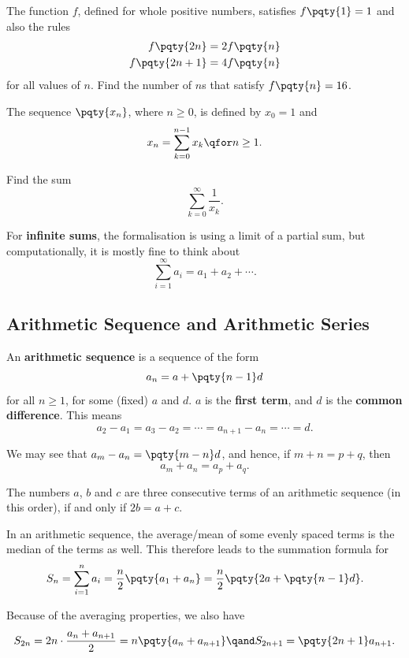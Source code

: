 \documentclass{article}
\begin{document}
\begin{example}
    The function \(f\), defined for whole positive numbers, satisfies \(f\pqty{1} = 1\) and also the rules
    \begin{align*}
        f\pqty{2n} &= 2 f\pqty{n} \\
        f\pqty{2n + 1} &= 4 f\pqty{n}
    \end{align*}
    for all values of \(n\). Find the number of \(n\)s that satisfy \(f\pqty{n} = 16\).
\end{example}

\begin{example}
    The sequence \(\pqty{x_n}\), where \(n \geq 0\), is defined by \(x_0 = 1\) and
    \[
        x_n = \sum_{k = 0}^{n - 1} x_k \qfor n \geq 1.
    \]  

    Find the sum
    \[
        \sum_{k = 0}^{\infty} \frac{1}{x_k}.
    \]
\end{example}

For \textbf{infinite sums}, the formalisation is using a limit of a partial sum, but computationally, it is mostly fine to think about
\[
    \sum_{i = 1}^{\infty} a_i = a_1 + a_2 + \cdots.
\]

\subsection{Arithmetic Sequence and Arithmetic Series}

An \textbf{arithmetic sequence} is a sequence of the form
\[
    a_n = a + \pqty{n - 1} d
\]
for all \(n \geq 1\), for some (fixed) \(a\) and \(d\). \(a\) is the \textbf{first term}, and \(d\) is the \textbf{common difference}. This means
\[
    a_2 - a_1 = a_3 - a_2 = \cdots = a_{n + 1} - a_n = \cdots = d.
\]

We may see that \(a_m - a_n = \pqty{m - n} d\), and hence, if \(m + n = p + q\), then
\[
    a_m + a_n = a_p + a_q.
\]

The numbers \(a\), \(b\) and \(c\) are three consecutive terms of an arithmetic sequence (in this order), if and only if \(2b = a + c\).

In an arithmetic sequence, the average/mean of some evenly spaced terms is the median of the terms as well. This therefore leads to the summation formula for
\[
    S_n = \sum_{i = 1}^{n} a_i = \frac{n}{2} \pqty{a_1 + a_n} = \frac{n}{2} \pqty{2 a + \pqty{n - 1}d}.
\]

Because of the averaging properties, we also have
\[
    S_{2n} = 2n \cdot \frac{a_n + a_{n + 1}}{2} = n \pqty{a_n + a_{n + 1}} \qand S_{2n + 1} = \pqty{2n + 1} a_{n + 1}.
\]
\end{document}
